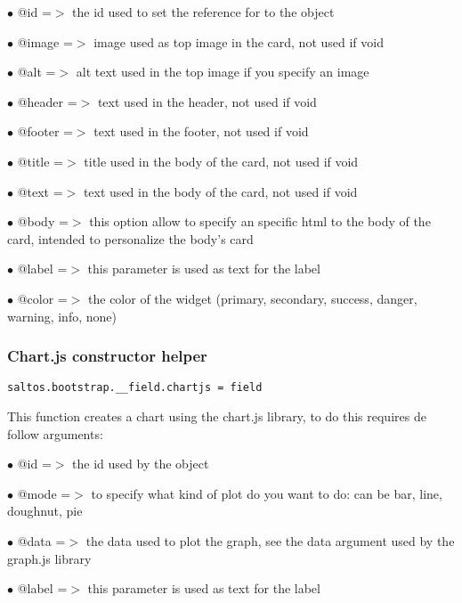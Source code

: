 \documentclass[a4paper]{article}
\begin{document}
\begin{compactitem}
\item[\color{myblue}$\bullet$] @id     =$>$ the id used to set the reference for to the object
\item[\color{myblue}$\bullet$] @image  =$>$ image used as top image in the card, not used if void
\item[\color{myblue}$\bullet$] @alt    =$>$ alt text used in the top image if you specify an image
\item[\color{myblue}$\bullet$] @header =$>$ text used in the header, not used if void
\item[\color{myblue}$\bullet$] @footer =$>$ text used in the footer, not used if void
\item[\color{myblue}$\bullet$] @title  =$>$ title used in the body of the card, not used if void
\item[\color{myblue}$\bullet$] @text   =$>$ text used in the body of the card, not used if void
\item[\color{myblue}$\bullet$] @body   =$>$ this option allow to specify an specific html to the body of the card, intended
           to personalize the body's card
\item[\color{myblue}$\bullet$] @label  =$>$ this parameter is used as text for the label
\item[\color{myblue}$\bullet$] @color  =$>$ the color of the widget (primary, secondary, success, danger, warning, info, none)
\end{compactitem}

\hypertarget{toc636}{}
\subsubsection{Chart.js constructor helper}

\begin{lstlisting}
saltos.bootstrap.__field.chartjs = field
\end{lstlisting}

This function creates a chart using the chart.js library, to do this requires de follow arguments:

\begin{compactitem}
\item[\color{myblue}$\bullet$] @id    =$>$ the id used by the object
\item[\color{myblue}$\bullet$] @mode  =$>$ to specify what kind of plot do you want to do: can be bar, line, doughnut, pie
\item[\color{myblue}$\bullet$] @data  =$>$ the data used to plot the graph, see the data argument used by the graph.js library
\item[\color{myblue}$\bullet$] @label =$>$ this parameter is used as text for the label
\end{compactitem}
\end{document}
